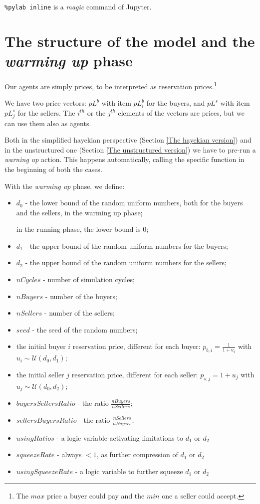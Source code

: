 \documentclass[10pt]{report}
\begin{document}
\verb|%pylab inline| 
is a \emph{magic} command of Jupyter.

\section{The structure of the model and the \emph{warming up} phase}\label{The structure of the model}

Our agents are simply prices, to be interpreted as reservation prices.\footnote{The $max$ price a buyer could pay and the $min$ one a seller could accept.}

We have two price vectors: $pL^b$ with item $pL^b_i$ for the buyers, and $pL^s$ with item $pL^s_j$ for the sellers. The $i^{th}$ or the $j^{th}$ elements of the vectors are prices, but  we can use them also as agents.

Both in the simplified hayekian perspective (Section \ref{The hayekian version}) and in the unstructured one (Section \ref{The unstructured version}) we have to pre-run a \emph{warning up} action. This happens automatically, calling the specific function in the beginning of both the cases.

With the \emph{warming up} phase, we define:

\begin{itemize}
\item $d_0$ - the lower bound of the random uniform numbers, both for the buyers and the sellers, in the warming up phase; 

in the running phase, the lower bound is $0$;
\item $d_1$ - the upper bound of the random uniform numbers for the buyers;
\item $d_2$ - the upper bound of the random uniform numbers for the sellers;
\item $nCycles$ - number of simulation cycles;
\item $nBuyers$  - number of the buyers;
\item $nSellers$ - number of the sellers;
\item $seed$ - the seed of the random numbers;
\item the initial buyer $i$ reservation price, different for each buyer: $p_{b,i}=\frac{1} {1 + u_i}$ with $u_i\sim\mathcal{U}(d_0,d_1)$;
\item the initial seller $j$ reservation price, different for each seller: $p_{s,j}=1 + u_j$ with $u_j\sim\mathcal{U}(d_0,d_2)$;
\item $buyersSellersRatio$ - the ratio $\frac{nBuyers}{nSellers}$;
\item $sellersBuyersRatio$ - the ratio $\frac{nSellers}{nBuyers}$;
\item $usingRatios$ - a logic variable activating limitations to $d_1$ or $d_2$
\item $squeezeRate$ - always $< 1$, as further compression of $d_1$ or $d_2$
\item $usingSqueezeRate$ - a logic variable to further squeeze $d_1$ or $d_2$
\end{itemize}
\end{document}
